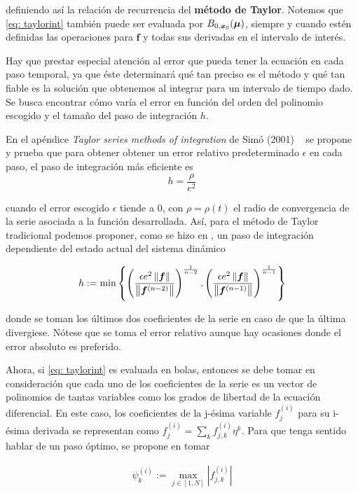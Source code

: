 definiendo así la relación de recurrencia del \textbf{método de Taylor}. Notemos que \ref{eq: taylorint} también puede ser evaluada por $B_{0,\bm{x}_0}(\bm{\mu})$, siempre y cuando estén definidas las operaciones para $\bm{f}$ y todas sus derivadas en el intervalo de interés.

Hay que prestar especial atención al error que pueda tener la ecuación en cada paso temporal, ya que éste determinará qué tan preciso es el método y qué tan fiable es la solución que obtenemos al integrar para un intervalo de tiempo dado. Se busca encontrar cómo varía el error en función del orden del polinomio escogido y el tamaño del paso de integración $h$.

En el apéndice \textit{Taylor series methods of integration} de Simó (2001) ~\cite{Simo2001} se propone y prueba que para obtener obtener un error relativo predeterminado $\epsilon$ en cada paso, el paso de integración más eficiente es 
\begin{equation}
 h = \frac{ \rho}{e^{2}}
\end{equation}

cuando el error escogido $\epsilon$ tiende a $0$, con $\rho = \rho(t)$ el radio de convergencia de la serie asociada a la función desarrollada. Así, para el método de Taylor tradicional podemos proponer, como se hizo en \cite{Perez2015}, un paso de integración dependiente del estado actual del sistema dinámico

\begin{align}
 h := \min{ \left\lbrace \left(\frac{ \epsilon e^2 \left\lVert\bm{f}\right\rVert }{ \left\lVert\bm{f}^{(n-2)}\right\rVert}\right)^{  \frac{1}{n-2} } , \left(\frac{ \epsilon e^2 \left\lVert\bm{f}\right\rVert}{ \left\lVert\bm{f}^{(n-1)}\right\rVert}\right)^{ \frac{1}{n-1} }  \right\rbrace }
\end{align}

donde se toman los últimos dos coeficientes de la serie en caso de que la última divergiese. Nótese que se toma el error relativo aunque hay ocasiones donde el error absoluto es preferido.

Ahora, si \ref{eq: taylorint} es evaluada en bolas, entonces se debe tomar en consideración que cada uno de los coeficientes  de la serie es un vector de polinomios de tantas variables como los grados de libertad de la ecuación diferencial. En este caso, los coeficientes de la j-ésima variable $f_j^(i)$ para su i-ésima derivada se representan como $f_j^{(i)} = \sum_k f_{j,k}^{(i)} \eta^k$. Para que tenga sentido hablar de un paso óptimo, se propone en \cite{Perez2015} tomar 

\begin{align*}
 \psi_k^{(i)} := \max_{j \in [1,N]}{|f_{j,k}^{(i)}|}
\end{align*}

